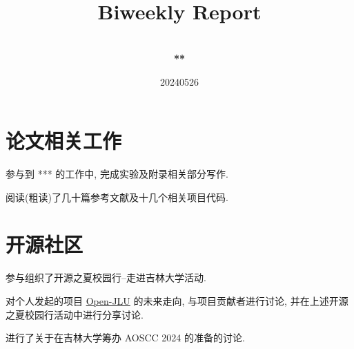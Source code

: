 \documentclass[a4paper]{article}
\title{
    \vspace*{1.0in}
     \\
    \vspace*{1in}
    \textbf{\Huge Biweekly Report}
    \vspace{0.5in}
}
\author{ \\
    \textbf{\huge ***} \\
    \vspace*{1in}
}
\date{\LARGE 20240526}
\begin{document}
\LARGE

\maketitle
\tableofcontents
\thispagestyle{empty}
\newpage

\section{论文相关工作}

参与到 *** 的工作中, 完成实验及附录相关部分写作.

阅读(粗读)了几十篇参考文献及十几个相关项目代码.

\section{开源社区}

参与组织了开源之夏校园行--走进吉林大学活动.

对个人发起的项目 \href{https://github.com/userElaina/Open-JLU}{Open-JLU} 的未来走向, 与项目贡献者进行讨论, 并在上述开源之夏校园行活动中进行分享讨论.

进行了关于在吉林大学筹办 AOSCC 2024 的准备的讨论.
\end{document}
